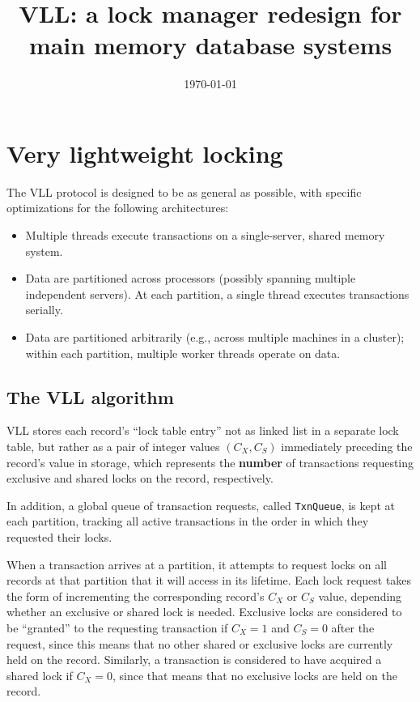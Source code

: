 \documentclass[11pt]{article}
\date{\today}
\title{VLL: a lock manager redesign for main memory database systems}
\begin{document}
\maketitle
\section{Very lightweight locking}
\label{sec:org81e937d}
The VLL protocol is designed to be as general as possible, with specific optimizations for the following architectures:
\begin{itemize}
\item Multiple threads execute transactions on a single-server, shared memory system.
\item Data are partitioned across processors (possibly spanning multiple independent servers). At each
partition, a single thread executes transactions serially.
\item Data are partitioned arbitrarily (e.g., across multiple machines in a cluster); within each
partition, multiple worker threads operate on data.
\end{itemize}
\subsection{The VLL algorithm}
\label{sec:org24230b5}
VLL stores each record's ``lock table entry'' not as linked list in a separate lock table, but rather as
a pair of integer values \((C_X,C_S)\) immediately preceding the record's value in storage, which
represents the \textbf{number} of transactions requesting exclusive and shared locks on the record,
respectively.

In addition, a global queue of transaction requests, called \texttt{TxnQueue}, is kept at each partition,
tracking all active transactions in the order in which they requested their locks.

When a transaction arrives at a partition, it attempts to request locks on all records at that
partition that it will access in its lifetime. Each lock request takes the form of incrementing the
corresponding record’s \(C_X\) or \(C_S\) value, depending whether an exclusive or shared lock is
needed. Exclusive locks are considered to be “granted” to the requesting transaction if \(C_X=1\) and
\(C_S=0\) after the request, since this means that no other shared or exclusive locks are currently
held on the record. Similarly, a transaction is considered to have acquired a shared lock if
\(C_X=0\), since that means that no exclusive locks are held on the record.
\end{document}
